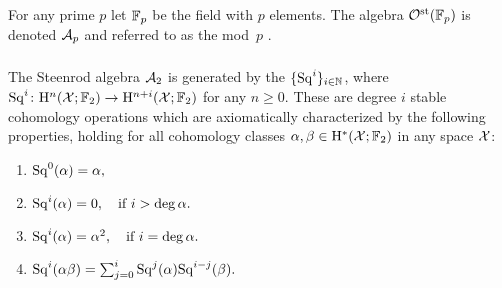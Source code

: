 For any prime $p$ let \({\mathbb{F}_p}\) be the field with \(p\) elements.
The algebra $\mathcal{O}^{\mathrm{st}}({\mathbb{F}_p})$ is denoted $\mathcal{A}_p$ and referred to as the mod~$p$ .

%

\subsubsection{}

The Steenrod algebra $\mathcal{A}_2$ is generated by the  $\{\mathrm{Sq}^i\}_{i \in \mathbb{N}}$, where $\mathrm{Sq}^i \colon \mathrm{H}^n(\mathcal{X}; {\mathbb{F}_2}) \to \mathrm{H}^{n+i}(\mathcal{X}; {\mathbb{F}_2})$ for any $n\geq 0$.
These are degree $i$ stable cohomology operations which are axiomatically characterized by the following properties, holding for all cohomology classes $\alpha,\beta \in \mathrm{H}^*(\mathcal{X}; {\mathbb{F}_2})$ in any space $\mathcal{X}$:
\begin{enumerate}
	\item \(\mathrm{Sq}^0(\alpha) = \alpha,\)
	\item \(\mathrm{Sq}^i(\alpha) = 0, \quad \text{if } i > \deg\alpha.\)
	\item \(\mathrm{Sq}^i(\alpha) = \alpha^2, \quad \text{if } i = \deg\alpha.\)
	\item \(\mathrm{Sq}^i(\alpha \beta) = \textstyle\sum_{j=0}^{i} \mathrm{Sq}^j(\alpha) \mathrm{Sq}^{i-j}(\beta).\)
\end{enumerate}

